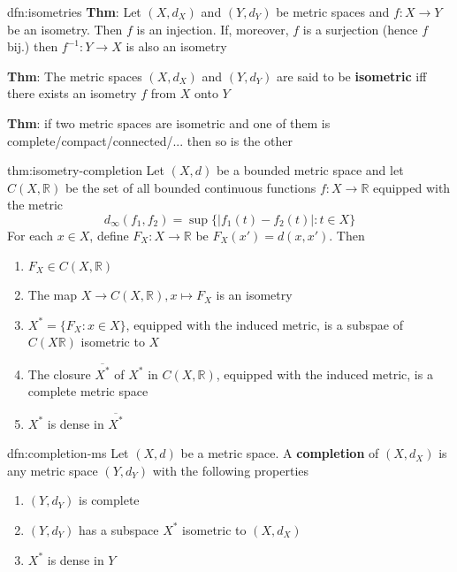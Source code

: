 \documentclass[landscape, 8pt]{extarticle}
\begin{document}
\begin{multicols}{3}
\begin{dfn}[Isometries]{dfn:isometries}{}
    \longrule{0.08ex}
    \textbf{Thm}: Let $(X, d_{X})$ and $(Y, d_{Y})$ be metric spaces and $f : X \to Y$ be an isometry. Then $f$ is an injection. If, moreover, $f$ is a surjection (hence $f$ bij.) then $f^{-1} : Y \to X$ is also an isometry

    \longrule{0.08ex}
    \textbf{Thm}: The metric spaces $(X, d_{X})$ and $(Y, d_{Y})$ are said to be \textbf{isometric} iff there exists an isometry $f$ from $X$ onto $Y$

    \longrule{0.08ex}
    \textbf{Thm}: if two metric spaces are isometric and one of them is complete/compact/connected/... then so is the other
\end{dfn}

\begin{thm}{thm:isometry-completion}{}
    Let $(X, d)$ be a bounded metric space and let $C(X, \mathbb{R})$ be the set of all bounded continuous functions $f : X \to \mathbb{R}$ equipped with the metric
    \[d_{\infty}(f_{1}, f_{2}) = \sup \{\lvert f_{1}(t) - f_{2}(t) \rvert : t\in X\}\]
    For each $x\in X$, define $F_{X} : X \to \mathbb{R}$ be $F_{X}(x') = d(x, x')$. Then
    \begin{enumerate}
        \item $F_{X} \in C(X, \mathbb{R})$
        \item The map $X \to C(X, \mathbb{R}), x \mapsto F_{X}$ is an isometry
        \item $X^{*} = \{F_{X} : x\in X\}$, equipped with the induced metric, is a subspae of $C(X \mathbb{R})$ isometric to $X$
        \item The closure $\overline{X^{*}}$ of $X^{*}$ in $C(X, \mathbb{R})$, equipped with the induced metric, is a complete metric space
        \item $X^{*}$ is dense in $\overline{X^{*}}$
    \end{enumerate}
\end{thm}

\begin{dfn}{dfn:completion-ms}{}
    Let $(X, d)$ be a metric space. A \textbf{completion} of $(X, d_{X})$ is any metric space $(Y, d_{Y})$ with the following properties
    \begin{enumerate}
        \item $(Y, d_{Y})$ is complete
        \item $(Y, d_{Y})$ has a subspace $X^{*}$ isometric to $(X, d_{X})$
        \item $X^{*}$ is dense in $Y$
    \end{enumerate}


\end{dfn}
\end{multicols}
\end{document}
